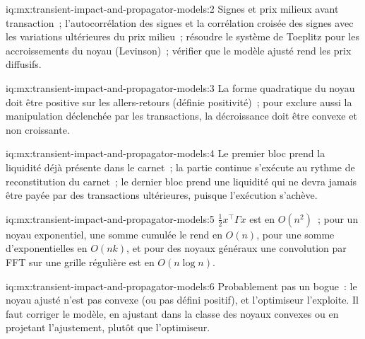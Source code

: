 \begin{solution}{iq:mx:transient-impact-and-propagator-models:2}
Signes et prix milieux avant transaction~; l'autocorrélation des signes et la corrélation croisée des signes avec les variations ultérieures du prix milieu~; résoudre le système de Toeplitz pour les accroissements du noyau
(Levinson)~; vérifier que le modèle ajusté rend les prix diffusifs.
\end{solution}

\begin{solution}{iq:mx:transient-impact-and-propagator-models:3}
La forme quadratique du noyau doit être positive sur les allers-retours (définie positivité)~; pour exclure aussi la manipulation déclenchée par les transactions, la décroissance doit être
convexe et non croissante.
\end{solution}

\begin{solution}{iq:mx:transient-impact-and-propagator-models:4}
Le premier bloc prend la liquidité déjà présente dans le carnet~; la partie continue s'exécute au rythme de reconstitution du carnet~; le dernier bloc prend une liquidité qui
ne devra jamais être payée par des transactions ultérieures, puisque l'exécution s'achève.
\end{solution}

\begin{solution}{iq:mx:transient-impact-and-propagator-models:5}
$\tfrac12x^\top\Gamma x$ est en $O(n^2)$~; pour un noyau exponentiel, une somme cumulée le rend en $O(n)$, pour une somme d'exponentielles en $O(nk)$, et pour des noyaux généraux une
convolution par FFT sur une grille régulière est en $O(n\log n)$.
\end{solution}

\begin{solution}{iq:mx:transient-impact-and-propagator-models:6}
Probablement pas un bogue~: le noyau ajusté n'est pas convexe (ou pas défini positif), et l'optimiseur l'exploite. Il faut corriger le modèle, en ajustant
dans la classe des noyaux convexes ou en projetant l'ajustement, plutôt que l'optimiseur.
\end{solution}
